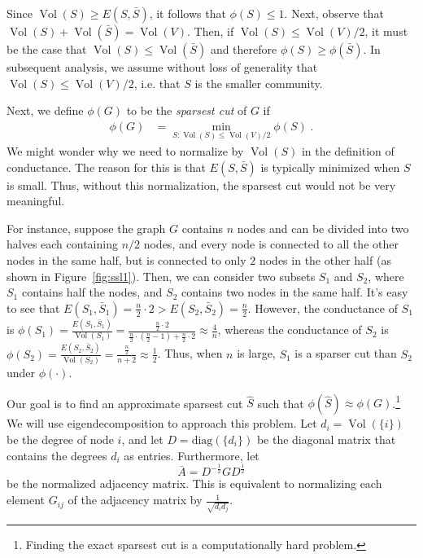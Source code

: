 Since $\operatorname{Vol}(S) \geq E(S, \bar{S})$, it follows that $\phi(S) \leq 1$. Next, observe that $\operatorname{Vol}(S) + \operatorname{Vol}(\bar{S}) = \operatorname{Vol}(V)$. Then, if $\operatorname{Vol}(S) \leq \operatorname{Vol}(V)/2$, it must be the case that $\operatorname{Vol}(S) \leq \operatorname{Vol}(\bar{S})$ and therefore $\phi(S) \geq \phi(\bar{S})$. In subsequent analysis, we assume without loss of generality that $\operatorname{Vol}(S) \leq \operatorname{Vol}(V)/2$, i.e. that $S$ is the smaller community.

Next, we define $\phi(G)$ to be the {\it sparsest cut} of $G$ if
\begin{align}
    \phi(G) &= \min_{S: \operatorname{Vol}(S) \leq \operatorname{Vol}(V)/2} \phi(S) \;.
\end{align}
We might wonder why we need to normalize by $\operatorname{Vol}(S)$ in the definition of conductance. The reason for this is that $E(S, \bar{S})$ is typically minimized when $S$ is small. Thus, without this normalization, the sparsest cut would not be very meaningful.

For instance, suppose the graph $G$ contains $n$ nodes and can be divided into two halves each containing $n/2$ nodes, and every node is connected to all the other nodes in the same half, but is connected to only $2$ nodes in the other half (as shown in Figure~\ref{fig:ssl1}). Then, we can consider two subsets $S_1$ and $S_2$, where $S_1$ contains half the nodes, and $S_2$ contains two nodes in the same half. It's easy to see that $E(S_1, \bar{S}_1) = \frac{n}{2}\cdot 2 > E(S_2, \bar{S}_2) = \frac{n}{2}$. However, the conductance of $S_1$ is $\phi(S_1) = \frac{E(S_1, \bar{S}_1)}{\operatorname{Vol}(S_1)} = \frac{\frac{n}{2}\cdot 2}{\frac{n}{2}\cdot(\frac{n}{2}-1)+\frac{n}{2}\cdot 2}\approx\frac{4}{n}$, whereas the conductance of $S_2$ is $\phi(S_2) = \frac{E(S_2, \bar{S}_2)}{\operatorname{Vol}(S_2)}=\frac{\frac{n}{2}}{n+2} \approx\frac{1}{2}$. Thus, when $n$ is large, $S_1$ is a sparser cut than $S_2$ under $\phi(\cdot)$. 


%

Our goal is to find an approximate sparsest cut $\hat{S}$ such that $\phi(\hat{S}) \approx \phi(G)$.\footnote{Finding the exact sparsest cut is a computationally hard problem.} We will use eigendecomposition to approach this problem. Let $d_i = \operatorname{Vol}(\{i\})$ be the degree of node $i$, and let $D = \text{diag}(\{d_i\})$ be the diagonal matrix that contains the degrees $d_i$ as entries. Furthermore, let 
\begin{equation}
    \bar{A} = D^{-\frac{1}{2}} G D^{\frac{1}{2}}
\end{equation}
be the normalized adjacency matrix. This is equivalent to normalizing each element $G_{ij}$ of the adjacency matrix by $\frac{1}{\sqrt{d_i d_j}}$.

